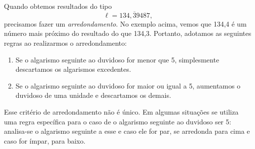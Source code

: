 Quando obtemos resultados do tipo
\begin{equation}
     \ell = 134,\overline{3}9487,
\end{equation}
%
precisamos fazer um \emph{arredondamento}. No exemplo acima, vemos que 134,4 é um número mais próximo do resultado do que 134,3. Portanto, adotamos as seguintes regras ao realizarmos o arredondamento:
\begin{enumerate}
     \item Se o algarismo seguinte ao duvidoso for menor que 5, simplesmente descartamos os algarismos excedentes.
     \item Se o algarismo seguinte ao duvidoso for maior ou igual a 5, aumentamos o duvidoso de uma unidade e descartamos os demais.
\end{enumerate}
%
Esse critério de arredondamento não é único. Em algumas situações se utiliza uma regra específica para o caso de o algarismo seguinte ao duvidoso ser 5: analisa-se o algarismo seguinte a esse e caso ele for par, se arredonda para cima e caso for ímpar, para baixo.

